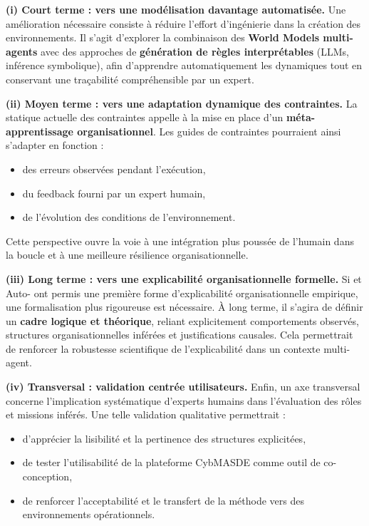 \medskip
\noindent
\textbf{(i) Court terme : vers une modélisation davantage automatisée.}
Une amélioration nécessaire consiste à réduire l’effort d’ingénierie dans la création des environnements.
Il s’agit d’explorer la combinaison des \textbf{World Models multi-agents} avec des approches de \textbf{génération de règles interprétables} (LLMs, inférence symbolique), afin d’apprendre automatiquement les dynamiques tout en conservant une traçabilité compréhensible par un expert.

\medskip
\noindent
\textbf{(ii) Moyen terme : vers une adaptation dynamique des contraintes.}
La statique actuelle des contraintes appelle à la mise en place d’un \textbf{méta-apprentissage organisationnel}.
Les guides de contraintes pourraient ainsi s’adapter en fonction :
\begin{itemize}
  \item des erreurs observées pendant l’exécution,
  \item du feedback fourni par un expert humain,
  \item de l’évolution des conditions de l’environnement.
\end{itemize}
Cette perspective ouvre la voie à une intégration plus poussée de l’humain dans la boucle et à une meilleure résilience organisationnelle.

\medskip
\noindent
\textbf{(iii) Long terme : vers une explicabilité organisationnelle formelle.}
Si  et Auto- ont permis une première forme d’explicabilité organisationnelle empirique, une formalisation plus rigoureuse est nécessaire.
À long terme, il s’agira de définir un \textbf{cadre logique et théorique}, reliant explicitement comportements observés, structures organisationnelles inférées et justifications causales.
Cela permettrait de renforcer la robustesse scientifique de l’explicabilité dans un contexte multi-agent.

\medskip
\noindent
\textbf{(iv) Transversal : validation centrée utilisateurs.}
Enfin, un axe transversal concerne l’implication systématique d’experts humains dans l’évaluation des rôles et missions inférés.
Une telle validation qualitative permettrait :
\begin{itemize}
  \item d’apprécier la lisibilité et la pertinence des structures explicitées,
  \item de tester l’utilisabilité de la plateforme CybMASDE comme outil de co-conception,
  \item de renforcer l’acceptabilité et le transfert de la méthode vers des environnements opérationnels.
\end{itemize}

